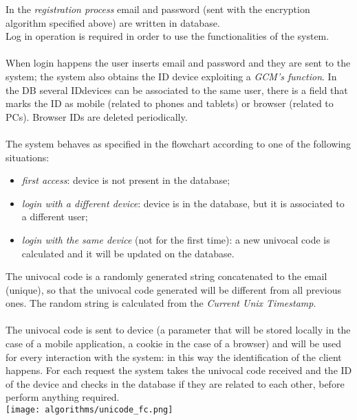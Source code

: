 In the \textit{registration process} email and password (sent with the encryption algorithm specified above) are written in database.\\
Log in operation is required in order to use the functionalities of the system.
\\\\
When login happens the user inserts email and password and they are sent to the system; the system also obtains the ID device exploiting a \textit{GCM's function}. In the DB several IDdevices can be associated to the same user, there is a field that marks the ID as mobile (related to phones and tablets) or browser (related to PCs). Browser IDs are deleted periodically. 
\\\\
The system behaves as specified in the flowchart according to one of the following situations:
\begin{itemize}
\item \textit{first access}: device is not present in the database;
\item \textit{login with a different device}: device is in the database, but it is associated to a different user;
\item \textit{login with the same device} (not for the first time): a new univocal code is calculated and it will be updated on the database.
\end{itemize}
The univocal code is a randomly generated string concatenated to the email (unique), so that the univocal code generated will be different from all previous ones. The random string is calculated from the \textit{Current Unix Timestamp}.
\\\\
The univocal code is sent to device (a parameter that will be stored locally in the case of a mobile application, a cookie in the case of a browser) and will be used for every interaction with the system: in this way the identification of the client happens. For each request the system takes the univocal code received and the ID of the device and checks in the database if they are related to each other, before perform anything required. 
\\
\texttt{[image: algorithms/unicode\_fc.png]}
\\
